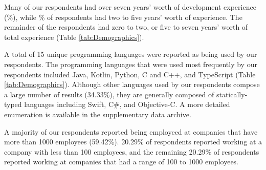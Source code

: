 \par Many of our respondents had over seven years' worth of development 
experience (\sevenPlus{}\%), while \twoToFive\% of respondents had two to five 
years' worth of experience. 
The remainder of the respondents had zero to two, or five to seven years' worth
of total experience (Table \ref{tab:Demographics}).

\par A total of 15 unique programming languages were reported as being used by
our respondents.
The programming languages that were used most frequently by our
respondents included Java, Kotlin, Python, C and C++, and TypeScript (Table
\ref{tab:Demographics}). 
Although other languages used by our respondents compose a large number of 
results (34.33\%), they are generally composed of statically-typed languages
including Swift, C\#, and Objective-C.
A more detailed enumeration is available in the supplementary data archive.

\par A majority of our respondents reported being employeed at companies that
have more than 1000 employees (59.42\%).
20.29\% of respondents reported working at a company with less than 100
employees, and the remaining 20.29\% of respondents reported working at
companies that had a range of 100 to 1000 employees.

